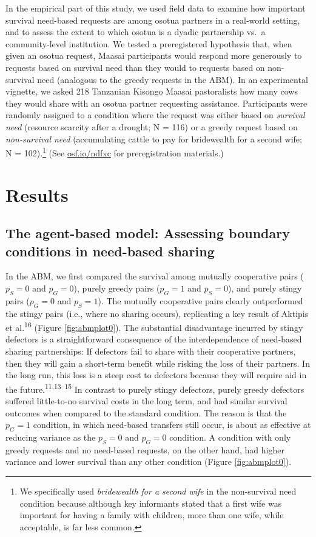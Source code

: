 \documentclass[
]{article}
\begin{document}
In the empirical part of this study, we used field data to examine how important survival need-based requests are among osotua partners in a real-world setting, and to assess the extent to which osotua is a dyadic partnership vs.~a community-level institution. We tested a preregistered hypothesis that, when given an osotua request, Maasai participants would respond more generously to requests based on survival need than they would to requests based on non-survival need (analogous to the greedy requests in the ABM). In an experimental vignette, we asked 218 Tanzanian Kisongo Maasai pastoralists how many cows they would share with an osotua partner requesting assistance. Participants were randomly assigned to a condition where the request was either based on \emph{survival need} (resource scarcity after a drought; N = 116) or a greedy request based on \emph{non-survival need} (accumulating cattle to pay for bridewealth for a second wife; N = 102).\footnote{We specifically used \emph{bridewealth for a second wife} in the non-survival need condition because although key informants stated that a first wife was important for having a family with children, more than one wife, while acceptable, is far less common.} (See \href{https://osf.io/ndfxc}{osf.io/ndfxc} for preregistration materials.)

\section*{Results}

\subsection*{The agent-based model: Assessing boundary conditions in need-based sharing}

In the ABM, we first compared the survival among mutually cooperative pairs (\(p_S=0\) and \(p_G=0\)), purely greedy pairs (\(p_G=1\) and \(p_S=0\)), and purely stingy pairs (\(p_G=0\) and \(p_S=1\)). The mutually cooperative pairs clearly outperformed the stingy pairs (i.e., where no sharing occurs), replicating a key result of Aktipis et al.\textsuperscript{16} (Figure \ref{fig:abmplot0}). The substantial disadvantage incurred by stingy defectors is a straightforward consequence of the interdependence of need-based sharing partnerships: If defectors fail to share with their cooperative partners, then they will gain a short-term benefit while risking the loss of their partners. In the long run, this loss is a steep cost to defectors because they will require aid in the future.\textsuperscript{11,13--15} In contrast to purely stingy defectors, purely greedy defectors suffered little-to-no survival costs in the long term, and had similar survival outcomes when compared to the standard condition. The reason is that the \(p_G=1\) condition, in which need-based transfers still occur, is about as effective at reducing variance as the \(p_S=0\) and \(p_G=0\) condition. A condition with only greedy requests and no need-based requests, on the other hand, had higher variance and lower survival than any other condition (Figure \ref{fig:abmplot0}).
\end{document}
